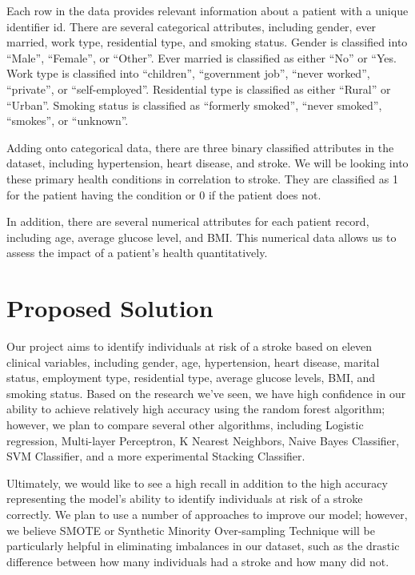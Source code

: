 \documentclass[11pt]{article}
\begin{document}
\medskip 

Each row in the data provides relevant information about a patient with a unique identifier id. There are several categorical attributes, including gender, ever married, work type, residential type, and smoking status. Gender is classified into “Male”, “Female”, or “Other”. Ever married is classified as either “No” or “Yes. Work type is classified into “children”, “government job”, “never worked”, “private”, or “self-employed”. Residential type is classified as either “Rural” or “Urban”. Smoking status is classified as “formerly smoked”, “never smoked”, “smokes”, or “unknown”. 

\medskip

Adding onto categorical data, there are three binary classified attributes in the dataset, including hypertension, heart disease, and stroke. We will be looking into these primary health conditions in correlation to stroke. They are classified as 1 for the patient having the condition or 0 if the patient does not. 

\medskip
In addition, there are several numerical attributes for each patient record, including age, average glucose level, and BMI. This numerical data allows us to assess the impact of a patient’s health quantitatively.


\section*{Proposed Solution}
Our project aims to identify individuals at risk of a stroke based on eleven clinical variables, including gender, age, hypertension, heart disease, marital status, employment type, residential type, average glucose levels, BMI, and smoking status. Based on the research we’ve seen, we have high confidence in our ability to achieve relatively high accuracy using the random forest algorithm; however, we plan to compare several other algorithms, including Logistic regression, Multi-layer Perceptron, K Nearest Neighbors, Naive Bayes Classifier, SVM Classifier, and a more experimental Stacking Classifier.

\medskip
Ultimately, we would like to see a high recall in addition to the high accuracy representing the model’s ability to identify individuals at risk of a stroke correctly. We plan to use a number of approaches to improve our model; however, we believe SMOTE or Synthetic Minority Over-sampling Technique will be particularly helpful in eliminating imbalances in our dataset, such as the drastic difference between how many individuals had a stroke and how many did not.
\end{document}
